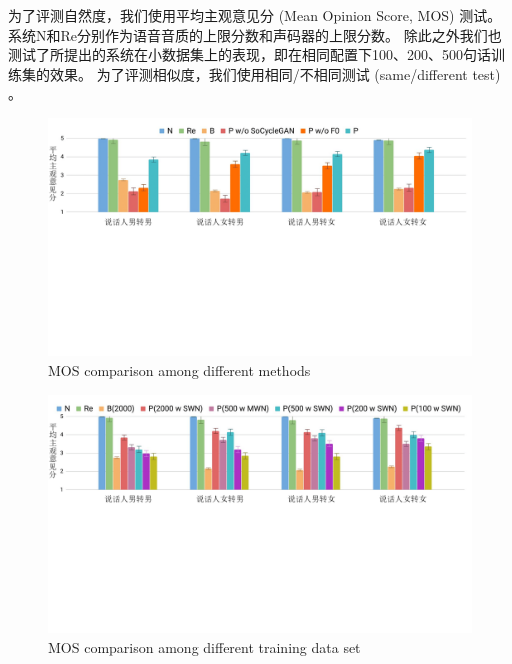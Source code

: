 为了评测自然度，我们使用平均主观意见分 (Mean Opinion Score, MOS) 测试。
系统N和Re分别作为语音音质的上限分数和声码器的上限分数。
除此之外我们也测试了所提出的系统在小数据集上的表现，即在相同配置下100、200、500句话训练集的效果。
为了评测相似度，我们使用相同/不相同测试 (same/different test) 。

\begin{figure}[!htp]
    \centering
    \includegraphics[width=13cm,trim=0 290 0 0,clip]{figure/4_mos.png}
    {MOS comparison among different methods}
    \label{fig:mos}
\end{figure}

\begin{figure}[!htp]
    \centering
    \includegraphics[width=13cm,trim=0 290 0 20,clip]{figure/4_mosdata.png}
    {MOS comparison among different training data set}
    \label{fig:mosdata}
\end{figure}


